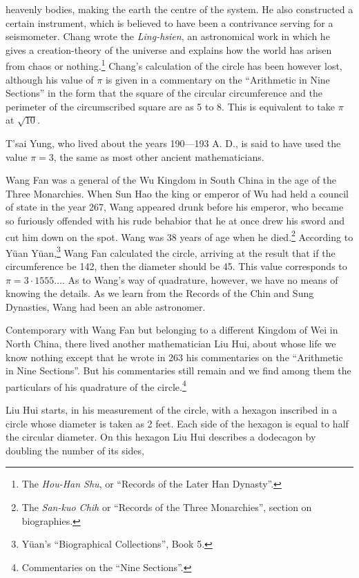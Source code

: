 \documentclass[11pt]{article}
\newcommand{\scanpage}[2]{\clearpage\setcounter{footnote}{0}\noindent{\footnotesize\color{gray}PDF page #1 · #2}\par\medskip}
\newcommand{\scanfooter}{}
\begin{document}
\scanpage{0061}{Chapter 7, printed page 47}
\setcounter{footnote}{0}
heavenly bodies, making the earth the centre of the system. He also constructed a certain instrument, which is believed to have been a contrivance serving for a seismometer. Chang wrote the \emph{Ling-hsien}, an astronomical work in which he gives a creation-theory of the universe and explains how the world has arisen from chaos or nothing.\footnote{The \emph{Hou-Han Shu}, or ``Records of the Later Han Dynasty''.} Chang's calculation of the circle has been however lost, although his value of $\pi$ is given in a commentary on the ``Arithmetic in Nine Sections'' in the form that the square of the circular circumference and the perimeter of the circumscribed square are as 5 to 8. This is equivalent to take $\pi$ at $\sqrt{10}$.

T'sai Yung, who lived about the years 190---193 A. D., is said to have used the value $\pi=3$, the same as most other ancient mathematicians.

Wang Fan was a general of the Wu Kingdom in South China in the age of the Three Monarchies. When Sun Hao the king or emperor of Wu had held a council of state in the year 267, Wang appeared drunk before his emperor, who became so furiously offended with his rude behabior that he at once drew his sword and cut him down on the spot. Wang was 38 years of age when he died.\footnote{The \emph{San-kuo Chih} or ``Records of the Three Monarchies'', section on biographies.} According to Yüan Yüan,\footnote{Yüan's ``Biographical Collections'', Book 5.} Wang Fan calculated the circle, arriving at the result that if the circumference be 142, then the diameter should be 45. This value corresponds to $\pi=3\cdot1555\ldots$. As to Wang's way of quadrature, however, we have no means of knowing the details. As we learn from the Records of the Chin and Sung Dynasties, Wang had been an able astronomer.

Contemporary with Wang Fan but belonging to a different Kingdom of Wei in North China, there lived another mathematician Liu Hui, about whose life we know nothing except that he wrote in 263 his commentaries on the ``Arithmetic in Nine Sections''. But his commentaries still remain and we find among them the particulars of his quadrature of the circle.\footnote{Commentaries on the ``Nine Sections''.}

Liu Hui starts, in his measurement of the circle, with a hexagon inscribed in a circle whose diameter is taken as 2 feet. Each side of the hexagon is equal to half the circular diameter. On this hexagon Liu Hui describes a dodecagon by doubling the number of its sides,
\scanfooter
\end{document}
